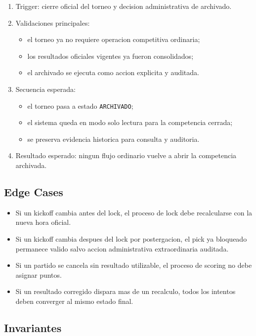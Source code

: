 \begin{enumerate}
  \item Trigger: cierre oficial del torneo y decision administrativa de archivado.
  \item Validaciones principales:
    \begin{itemize}
      \item el torneo ya no requiere operacion competitiva ordinaria;
      \item los resultados oficiales vigentes ya fueron consolidados;
      \item el archivado se ejecuta como accion explicita y auditada.
    \end{itemize}
  \item Secuencia esperada:
    \begin{itemize}
      \item el torneo pasa a estado \texttt{ARCHIVADO};
      \item el sistema queda en modo solo lectura para la competencia cerrada;
      \item se preserva evidencia historica para consulta y auditoria.
    \end{itemize}
  \item Resultado esperado: ningun flujo ordinario vuelve a abrir la competencia archivada.
\end{enumerate}

\subsection{Edge Cases}

\begin{itemize}
  \item Si un kickoff cambia antes del lock, el proceso de lock debe recalcularse con la nueva hora oficial.
  \item Si un kickoff cambia despues del lock por postergacion, el pick ya bloqueado permanece valido salvo accion administrativa extraordinaria auditada.
  \item Si un partido se cancela sin resultado utilizable, el proceso de scoring no debe asignar puntos.
  \item Si un resultado corregido dispara mas de un recalculo, todos los intentos deben converger al mismo estado final.
\end{itemize}

\subsection{Invariantes}


